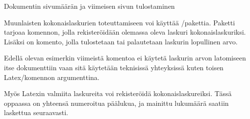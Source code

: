 \begin{esimerkki*}
\caption{Dokumentin sivumäärän ja viimeisen sivun tulostaminen}
\label{esim:totpages}
\end{esimerkki*}

Muunlaisten kokonaislaskurien toteuttamiseen voi käyttää
\-/pakettia. Paketti tarjoaa
komennon, jolla rekisteröidään olemassa oleva laskuri
kokonaislaskuriksi. Lisäksi on komento, jolla tulostetaan tai
palautetaan laskurin lopullinen arvo.

\begin{koodilohkosis}
  \addtocounter{oma}{1} %
\end{koodilohkosis}

Edellä olevan esimerkin viimeistä komentoa  ei
käytetä laskurin arvon latomiseen itse dokumenttiin vaan sitä käytetään
teknisissä yhteyksissä kuten toisen Latex\-/komennon argumenttina.

Myös Latexin valmiita laskureita voi rekisteröidä kokonaislaskureiksi.
Tässä oppaassa on yhteensä  numeroitua päälukua, ja
mainittu lukumäärä saatiin laskettua seuraavasti.

\begin{koodilohkosis}
\end{koodilohkosis}
